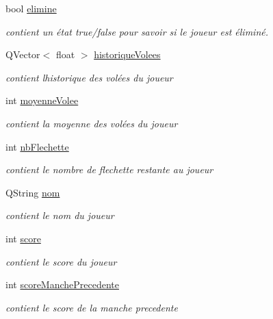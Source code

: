 \begin{DoxyCompactItemize}
\item 
bool \hyperlink{class_joueur_acac733012102f81d05b0a4c0801fcf61}{elimine}
\begin{DoxyCompactList}\small\item\em contient un état true/false pour savoir si le joueur est éliminé. \end{DoxyCompactList}\item 
Q\+Vector$<$ float $>$ \hyperlink{class_joueur_aeb24d1e8125a7bf302167b91a945687e}{historique\+Volees}
\begin{DoxyCompactList}\small\item\em contient l\textquotesingle{}historique des volées du joueur \end{DoxyCompactList}\item 
int \hyperlink{class_joueur_ac5641a2a8fc1deebe5bba27bf21eb446}{moyenne\+Volee}
\begin{DoxyCompactList}\small\item\em contient la moyenne des volées du joueur \end{DoxyCompactList}\item 
int \hyperlink{class_joueur_a330099a1952fbf97b2faea2c640b32f5}{nb\+Flechette}
\begin{DoxyCompactList}\small\item\em contient le nombre de flechette restante au joueur \end{DoxyCompactList}\item 
Q\+String \hyperlink{class_joueur_ab06d7f1e6b482299bb03919e0cd2166d}{nom}
\begin{DoxyCompactList}\small\item\em contient le nom du joueur \end{DoxyCompactList}\item 
int \hyperlink{class_joueur_a680896b9ff71c2762ae653ef6aa7c8ce}{score}
\begin{DoxyCompactList}\small\item\em contient le score du joueur \end{DoxyCompactList}\item 
int \hyperlink{class_joueur_ac78f2e83781d2bdeb9a613dc37812736}{score\+Manche\+Precedente}
\begin{DoxyCompactList}\small\item\em contient le score de la manche precedente \end{DoxyCompactList}\end{DoxyCompactItemize}


